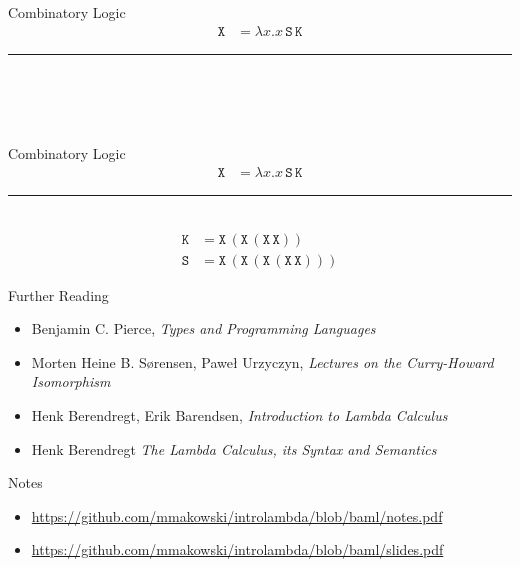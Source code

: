 \documentclass{beamer}
\newcommand{\msym}[1]{\mathtt{#1}}
\newcommand{\hr}[0]{\rule{10.75cm}{0.4pt}\\}
\begin{document}
\begin{frame}{Combinatory Logic}
\begin{align*}
\msym{X} &= \lambda x.x\,\msym{S}\,\msym{K}
\end{align*}
\hr
\begin{align*}
\phantom{\msym{K} = \msym{X}\,(\msym{X}\,(\msym{X}\,\msym{X}))} \\
\phantom{\msym{S} = \msym{X}\,(\msym{X}\,(\msym{X}\,(\msym{X}\,\msym{X})))}
\end{align*}
\end{frame}
\begin{frame}{Combinatory Logic}
\begin{align*}
\msym{X} &= \lambda x.x\,\msym{S}\,\msym{K}
\end{align*}
\hr
\begin{align*}
\msym{K} &= \msym{X}\,(\msym{X}\,(\msym{X}\,\msym{X})) \\
\msym{S} &= \msym{X}\,(\msym{X}\,(\msym{X}\,(\msym{X}\,\msym{X})))
\end{align*}
\end{frame}

\begin{frame}{Further Reading}
\begin{itemize}
\item Benjamin C. Pierce, \emph{Types and Programming Languages}
\item Morten Heine B. Sørensen, Paweł Urzyczyn, \emph{Lectures on the
Curry-Howard Isomorphism}
\item Henk Berendregt, Erik Barendsen, \emph{Introduction to Lambda
Calculus}
\item Henk Berendregt \emph{The Lambda Calculus, its Syntax and
Semantics}
\end{itemize}
\end{frame}

\begin{frame}{Notes}
\begin{itemize}
\item \url{https://github.com/mmakowski/introlambda/blob/baml/notes.pdf}
\item \url{https://github.com/mmakowski/introlambda/blob/baml/slides.pdf}
\end{itemize}
\end{frame}
\end{document}
